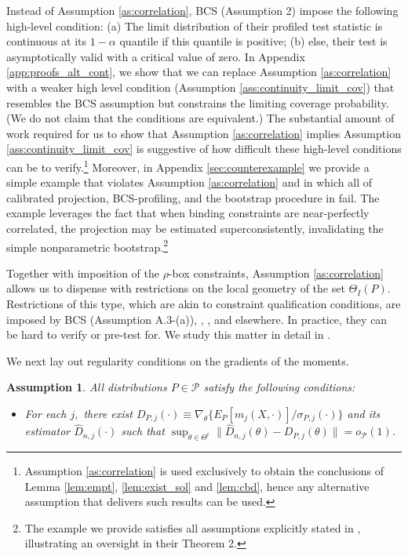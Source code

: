 \documentclass[letterpaper,11pt]{article}
\theoremstyle{myplain}
\theoremstyle{mydefinition}
\newtheorem{assumption}{Assumption}[section]
\theoremstyle{myremark}
\renewcommand{\cite}{\citet}
\newcommand{\cP}{\mathcal{P}}
\numberwithin{equation}{section}
\numberwithin{figure}{section}
\begin{document}
\begin{appendices}
Instead of Assumption \ref{as:correlation}, BCS (Assumption 2) impose the following high-level condition: (a) The limit distribution of their profiled test statistic is continuous at its $1-\alpha$ quantile if this quantile is positive; (b) else, their test is asymptotically valid with a critical value of zero. In Appendix \ref{app:proofs_alt_cont}, we show that we can replace Assumption \ref{as:correlation} with a weaker high level condition (Assumption \ref{ass:continuity_limit_cov}) that resembles the BCS assumption but constrains the limiting coverage probability. (We do not claim that the conditions are equivalent.) The substantial amount of work required for us to show that Assumption \ref{as:correlation} implies Assumption \ref{ass:continuity_limit_cov} is suggestive of how difficult these high-level conditions can be to verify.\footnote{Assumption \ref{as:correlation} is used exclusively to obtain the conclusions of Lemma \ref{lem:empt}, \ref{lem:exist_sol} and \ref{lem:cbd}, hence any alternative assumption that delivers such results can be used.}
Moreover, in Appendix \ref{sec:counterexample} we provide a simple example that violates Assumption \ref{as:correlation} and in which all of calibrated projection, BCS-profiling, and the bootstrap procedure in \cite{PakesPorterHo2011} fail. The example leverages the fact that when binding constraints are near-perfectly correlated, the projection may be estimated superconsistently, invalidating the simple nonparametric bootstrap.\footnote{The example we provide satisfies all assumptions explicitly stated in \cite{PakesPorterHo2011}, illustrating an oversight in their Theorem 2.}

Together with imposition of the $\rho$-box constraints, Assumption \ref{as:correlation} allows us to dispense with restrictions on the local geometry of the set $\Theta_I(P)$. Restrictions of this type, which are akin to constraint qualification conditions, are imposed by BCS (Assumption A.3-(a)), \cite[Assumptions A.3-A.4]{PakesPorterHo2011}, \cite[Condition C.2]{CHT}, and elsewhere. In practice, they can be hard to verify or pre-test for. We study this matter in detail in \cite{KMS2}.

We next lay out regularity conditions on the gradients of the moments. 
\begin{assumption}
\label{as:momP_KMS} All distributions $P\in \cP$ satisfy  the following conditions:
\begin{itemize}

\item[(i)] For each $j,$ there exist $D_{P,j}(\cdot)\equiv\nabla_\theta
\{E_P[m_j(X,\cdot)]/\sigma_{P,j}(\cdot)\}$ and its estimator $\hat D_{n,j}(\cdot)$ such that $\sup_{\theta\in\Theta^\epsilon}\|\hat D_{n,j}(\theta)-D_{P,j}(\theta)\|=o_{\cP}(1)$.



\end{itemize}
\end{assumption}
\end{appendices}
\end{document}
